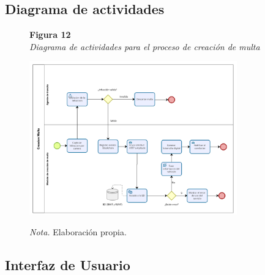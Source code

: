 \subsection{ Diagrama de actividades }
 \begin{figure}[htbp]
    \begin{flushleft}
        \textbf{Figura 12}\\[2em]
        \textit{Diagrama de actividades para el proceso de creación de multa}
    \end{flushleft}
    \vspace{1em}
    \centering
    \includegraphics[width=0.8\textwidth]{Images/ActMulta.png}
    \vspace{2em}
    \begin{flushleft}
        \textit{Nota.} Elaboración propia.
    \end{flushleft}
    \label{fig:diagrama_creacion_multa}
\end{figure}

\subsection{Interfaz de Usuario}
